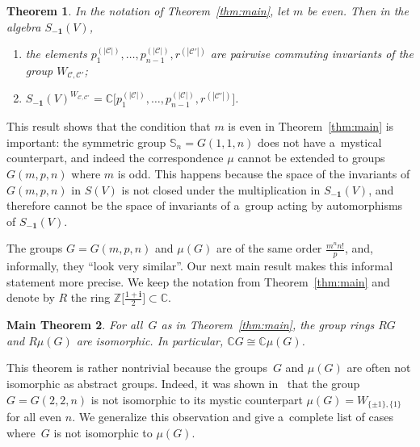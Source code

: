 \documentclass[pdftex]{sigma}
\newtheorem{Theorem}{Theorem}[section]
\newtheorem{maintheorem}[Theorem]{Main Theorem}
\begin{document}
\begin{Theorem}
In the notation of Theorem~{\rm \ref{thm:main}}, let $m$ be even.
Then in the algebra $S_{\mathbf{-1}}(V)$,
\begin{enumerate}\itemsep=0pt
\item[$(a)$] the elements $p_1^{(|\mathcal C|)},\ldots,p_{n-1}^{(|\mathcal C|)}, r^{(|\mathcal C'|)}$ are pairwise commuting
invariants of the group $W_{\mathcal C,\mathcal C'}$;

\item[$(b)$] $S_{\mathbf{-1}}(V)^{W_{\mathcal C,\mathcal C'}} = \mathbb C\big[p_1^{(|\mathcal C|)},\ldots,p_{n-1}^{(|\mathcal C|)},r^{(|\mathcal C'|)}\big]$.
\end{enumerate}
\end{Theorem}

\begin{Remark}%
This result shows that the condition that $m$ is even in Theorem~\ref{thm:main} is important: the symmetric group
$\mathbb S_n=G(1,1,n)$ does not have a~mystical counterpart, and indeed the correspondence $\mu$ cannot be extended to
groups $G(m,p,n)$ where $m$ is odd.
This happens because the space of the invariants of $G(m,p,n)$ in $S(V)$ is not closed under the multiplication in
$S_{\mathbf{-1}}(V)$, and therefore cannot be the space of invariants of a~group acting by automorphisms of
$S_{\mathbf{-1}}(V)$.
\end{Remark}

The groups $G=G(m,p,n)$ and $\mu(G)$ are of the same order $\frac{m^n n!}{p}$, and, informally, they ``look very similar''.
Our next main result makes this informal statement more precise.
We keep the notation from Theorem~\ref{thm:main} and denote by $R$ the ring $\mathbb
Z\big[\frac{1+\mathbf{i}}{2}\big]\subset\mathbb C$.
\begin{maintheorem}
\label{thm:main2}
For all~$G$ as in Theorem~{\rm \ref{thm:main}}, the group rings $RG$ and $R\mu(G)$ are isomorphic.
In particular, $ \mathbb C G \cong \mathbb C \mu(G) $.
\end{maintheorem}

This theorem is rather nontrivial because the groups~$G$ and $\mu(G)$ are often not isomorphic as abstract groups.
Indeed, it was shown in~\cite[Example 7.3]{KKZ} that the group $G=G(2,2,n)$ is not isomorphic to its mystic counterpart
$\mu(G)=W_{\{\pm1\},\{1\}}$ for all even $n$.
We generalize this observation and give a~complete list of cases where~$G$ is not isomorphic to $\mu(G)$.
\end{document}
